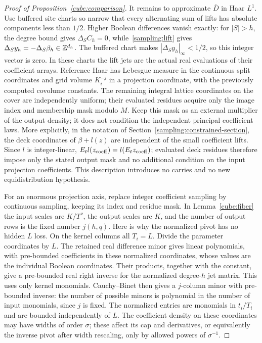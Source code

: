 \begin{proof}[Proof of Proposition~\ref{cube:comparison}]
It remains to approximate $\overline D$ in Haar $L^1$.  Use buffered
site charts so narrow that every alternating sum of lifts has
absolute components less than $1/2$.  Higher Boolean differences
vanish exactly: for $|S|>h$, the degree bound gives
$\Delta_SC_h=0$, while~\eqref{sampling:lift} gives
$\Delta_Sy_h=-\Delta_S\beta_h\in\mathbb Z^{d_h}$. The buffered chart
makes $|\Delta_Sy_h|_\infty<1/2$, so this integer vector is zero.
In these charts the lift jets are the actual real evaluations of their
coefficient arrays.  Reference Haar has Lebesgue measure in the
continuous split coordinates and grid volume $K_i^{-j}$ in a
projection coordinate, with the previously computed covolume
constants.  The remaining integral lattice coordinates on the cover
are independently uniform; their evaluated residues acquire only
the image index and membership mask modulo $M$.  Keep this mask
as an external multiplier of the output density; it does not
condition the independent principal coefficient laws.  More explicitly,
in the notation of Section~\ref{sampling:constrained-section}, the deck coordinates
of $\beta+l(z)$ are independent of the small coefficient lifts.
Since $l$ is integer-linear,
$E_tl(z_{\rm coeff})=l(E_tz_{\rm coeff})$; evaluated deck residues
therefore impose only the stated output mask and no additional
condition on the input projection coefficients.  This description
introduces no carries and no new equidistribution hypothesis.

For an enormous projection axis, replace integer coefficient
sampling by continuous sampling, keeping its index and residue
mask.  In Lemma~\ref{cube:fiber} the input scales are $K/T^\nu$,
the output scales are $K$, and the number of output rows is the fixed
number $j(h,q)$.  Here is why the normalized pivot has no hidden
$L$ loss.  On the kernel columns all $T_i=L$.  Divide the parameter
coordinates by $L$.  The retained real difference minor gives
linear polynomials, with pre-bounded coefficients in these
normalized coordinates, whose values are the individual Boolean
coordinates.  Their products, together with the constant, give a
pre-bounded real right inverse for the normalized degree-$h$ jet
matrix.  This uses only kernel monomials.  Cauchy--Binet then gives
a $j$-column minor with pre-bounded inverse: the number of possible
minors is polynomial in the number of input monomials, since $j$
is fixed.  The normalized entries are monomials in $t_i/T_i$ and
are bounded independently of $L$.  The coefficient density on these
coordinates may have widths of order $\sigma$; these affect its
cap and derivatives, or equivalently the inverse pivot after width
rescaling, only by allowed powers of $\sigma^{-1}$.


\end{proof}
